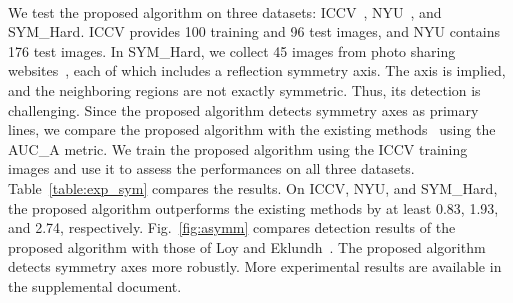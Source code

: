 \documentclass[runningheads]{llncs}
\begin{document}
\begin{figure*}[t]


    \centering
{}\,\!\!
    \,\!\!
    \,\!\!
    \,\!\!

    \caption
    {
        Detection results of symmetry axes. The ground-truth axes are in red, the detection results of Loy and Eklundh~\cite{loy2006} are in green, and those of the proposed algorithm are in yellow.
    }
    \label{fig:asymm}

\end{figure*}


We test the proposed algorithm on three datasets: ICCV~\cite{funk2017}, NYU~\cite{cicconet2017}, and SYM\_Hard. ICCV provides 100 training and 96 test images, and NYU contains 176 test images. In SYM\_Hard, we collect 45 images from photo sharing websites~\cite{Flickr,Google}, each of which includes a reflection symmetry axis. The axis is implied, and the neighboring regions are not exactly symmetric. Thus, its detection is challenging. Since the proposed algorithm detects symmetry axes as primary lines, we compare the proposed algorithm with the existing methods~\cite{loy2006,cicconet2017_nyu,elawady2017,cicconet2017} using the AUC\_A metric. We train the proposed algorithm using the ICCV training images and use it to assess the performances on all three datasets.  Table~\ref{table:exp_sym} compares the results. On ICCV, NYU, and SYM\_Hard, the proposed algorithm outperforms the existing methods by at least 0.83, 1.93, and 2.74, respectively. Fig.~\ref{fig:asymm} compares detection results of the proposed algorithm with those of Loy and Eklundh~\cite{loy2006}. The proposed algorithm detects symmetry axes more robustly.  More experimental results are available in the supplemental document.
\end{document}
